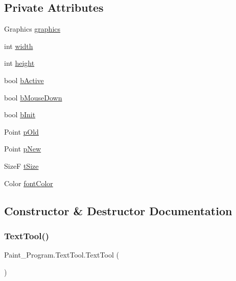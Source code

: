 \subsection*{Private Attributes}
\begin{DoxyCompactItemize}
\item 
Graphics \mbox{\hyperlink{class_paint___program_1_1_text_tool_aebcdbc77df8cc28b59213744989d2b74}{graphics}}
\item 
int \mbox{\hyperlink{class_paint___program_1_1_text_tool_a77267cf0c8405057fb527c0ac3e81229}{width}}
\item 
int \mbox{\hyperlink{class_paint___program_1_1_text_tool_ab6ddb1da76c16dd70e8d1682d0770b41}{height}}
\item 
bool \mbox{\hyperlink{class_paint___program_1_1_text_tool_a2f0edf40e994616034bd0c71ce1d1735}{b\+Active}}
\item 
bool \mbox{\hyperlink{class_paint___program_1_1_text_tool_a9a3ba132a7bc742c7dede40be6bbeeee}{b\+Mouse\+Down}}
\item 
bool \mbox{\hyperlink{class_paint___program_1_1_text_tool_a7e8cc3ec53e73fc57bc1f6c698654bb1}{b\+Init}}
\item 
Point \mbox{\hyperlink{class_paint___program_1_1_text_tool_ad0b053bdd29fa0a048dd743305ad76b3}{p\+Old}}
\item 
Point \mbox{\hyperlink{class_paint___program_1_1_text_tool_ad3f0da3f42463a6c21694898bfb37f7d}{p\+New}}
\item 
SizeF \mbox{\hyperlink{class_paint___program_1_1_text_tool_a2fe7070d05a4b5970daf782a2cd3a54b}{t\+Size}}
\item 
Color \mbox{\hyperlink{class_paint___program_1_1_text_tool_af0636766c9cdf1139840aaa79a513cd9}{font\+Color}}
\end{DoxyCompactItemize}


\subsection{Constructor \& Destructor Documentation}
\mbox{\label{class_paint___program_1_1_text_tool_a600ec6a0003ca544a857f7e6a79f5688}} 
\subsubsection{\texorpdfstring{Text\+Tool()}{TextTool()}}
{\footnotesize\ttfamily Paint\+\_\+\+Program.\+Text\+Tool.\+Text\+Tool (\begin{DoxyParamCaption}{ }\end{DoxyParamCaption})\hspace{0.3cm}{\ttfamily [inline]}}



